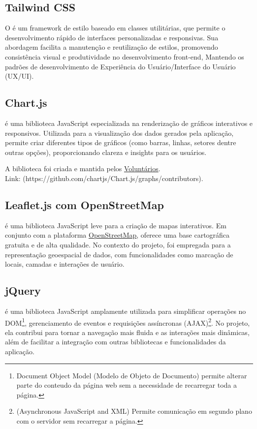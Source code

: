 \subsection{Tailwind CSS}
\par O  é um framework de estilo baseado em classes utilitárias, que permite o desenvolvimento rápido de interfaces personalizadas e responsivas. Sua abordagem facilita a manutenção e reutilização de estilos, promovendo consistência visual e produtividade no desenvolvimento front-end, Mantendo os padrões de desenvolvimento de Experiência do Usuário/Interface do Usuário (UX/UI).

\subsection{Chart.js}
\par {} é uma biblioteca JavaScript especializada na renderização de gráficos interativos e responsivos. Utilizada para a visualização dos dados gerados pela aplicação, permite criar diferentes tipos de gráficos (como barras, linhas, setores dentre outras opções), proporcionando clareza e insights para os usuários.
\par A biblioteca foi criada e mantida pelos \href{https://github.com/chartjs/Chart.js/graphs/contributors}{Voluntários}. \\
Link: (https://github.com/chartjs/Chart.js/graphs/contributors).

\subsection{Leaflet.js com OpenStreetMap}
\par {} é uma biblioteca JavaScript leve para a criação de mapas interativos. Em conjunto com a plataforma \href{https://www.openstreetmap.org/#map=7/-26.613/-50.746}{OpenStreetMap}, oferece uma base cartográfica gratuita e de alta qualidade. No contexto do projeto, foi empregada para a representação geoespacial de dados, com funcionalidades como marcação de locais, camadas e interações de usuário.

\subsection{jQuery}\label{jQuery}
\par {} é uma biblioteca JavaScript amplamente utilizada para simplificar operações no DOM\footnote{Document Object Model (Modelo de Objeto de Documento) permite alterar parte do conteudo da página web sem a necessidade de recarregar toda a página.}, gerenciamento de eventos e requisições assíncronas (AJAX)\footnote{(Asynchronous JavaScript and XML) Permite comunicação em segundo plano com o servidor sem recarregar a página.}. No projeto, ela contribui para tornar a navegação mais fluida e as interações mais dinâmicas, além de facilitar a integração com outras bibliotecas e funcionalidades da aplicação.

